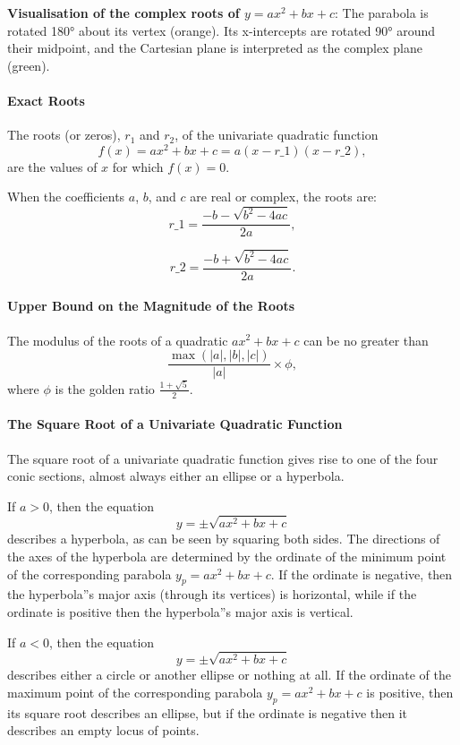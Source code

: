 
\textbf{Visualisation of the complex roots of $y = ax^2 + bx + c$}: The parabola is rotated 180° about its vertex (orange). Its x-intercepts are rotated 90° around their midpoint, and the Cartesian plane is interpreted as the complex plane (green).


\paragraph{Exact Roots}

The roots (or zeros), $r_1$ and $r_2$, of the univariate quadratic function
$$
f(x) = ax^2 + bx + c = a(x - r\_1)(x - r\_2),
$$
are the values of $x$ for which $f(x) = 0$.

When the coefficients $a$, $b$, and $c$ are real or complex, the roots are:
$$
r\_1 = \frac{-b - \sqrt{b^2 - 4ac}}{2a},
$$

$$
r\_2 = \frac{-b + \sqrt{b^2 - 4ac}}{2a}.
$$
\paragraph{Upper Bound on the Magnitude of the Roots}

The modulus of the roots of a quadratic $ax^2 + bx + c$ can be no greater than
$$
\frac{\max(|a|, |b|, |c|)}{|a|} \times \phi,
$$
where $\phi$ is the golden ratio $\frac{1 + \sqrt{5}}{2}$.

\paragraph{The Square Root of a Univariate Quadratic Function}

The square root of a univariate quadratic function gives rise to one of the four conic sections, almost always either an ellipse or a hyperbola.

If $a > 0$, then the equation
$$
y = \pm \sqrt{ax^2 + bx + c}
$$
describes a hyperbola, as can be seen by squaring both sides. The directions of the axes of the hyperbola are determined by the ordinate of the minimum point of the corresponding parabola $y_p = ax^2 + bx + c$. If the ordinate is negative, then the hyperbola''s major axis (through its vertices) is horizontal, while if the ordinate is positive then the hyperbola''s major axis is vertical.

If $a < 0$, then the equation
$$
y = \pm \sqrt{ax^2 + bx + c}
$$
describes either a circle or another ellipse or nothing at all. If the ordinate of the maximum point of the corresponding parabola $y_p = ax^2 + bx + c$ is positive, then its square root describes an ellipse, but if the ordinate is negative then it describes an empty locus of points.

